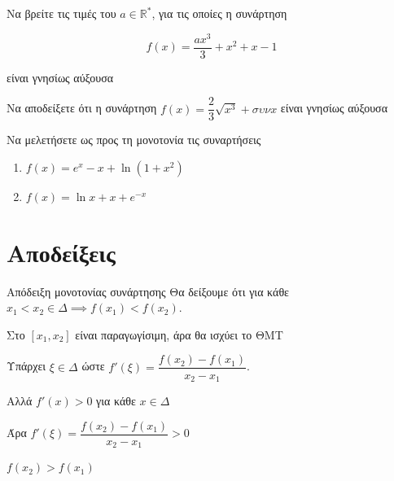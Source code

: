 \documentclass{presentation}
\begin{document}
\begin{askisi}
  Να βρείτε τις τιμές του $a\in \mathbb{R}^*$, για τις οποίες η συνάρτηση

  $$f(x)=\dfrac{ax^3}{3}+x^2+x-1$$

  είναι γνησίως αύξουσα

\end{askisi}

\begin{askisi}
  Να αποδείξετε ότι η συνάρτηση $f(x)=\dfrac{2}{3}\sqrt{x^3}+συνx$ είναι γνησίως αύξουσα

\end{askisi}

\begin{askisi}
  Να μελετήσετε ως προς τη μονοτονία τις συναρτήσεις
  \begin{enumerate}
    \item<1-> $f(x)=e^x-x+\ln (1+x^2)$
    \item<2-> $f(x)=\ln x+x+e^{-x}$
  \end{enumerate}

\end{askisi}


\appendix

\section{Αποδείξεις}
\begin{frame}[label=Απόδειξη1]{Απόδειξη μονοτονίας συνάρτησης}
  Θα δείξουμε ότι για κάθε $x_1<x_2\in Δ \implies f(x_1)<f(x_2)$.

   Στο $[x_1,x_2]$ είναι παραγωγίσιμη, άρα θα ισχύει το ΘΜΤ

   Υπάρχει $ξ\in Δ$ ώστε $f'(ξ)=\dfrac{f(x_2)-f(x_1)}{x_2-x_1}$.

   Αλλά $f'(x)>0$ για κάθε $x\in Δ$

   Άρα $f'(ξ)=\dfrac{f(x_2)-f(x_1)}{x_2-x_1}>0$

   $f(x_2)>f(x_1)$

  \hyperlink{Θεώρημα1}{}
\end{frame}
\end{document}
